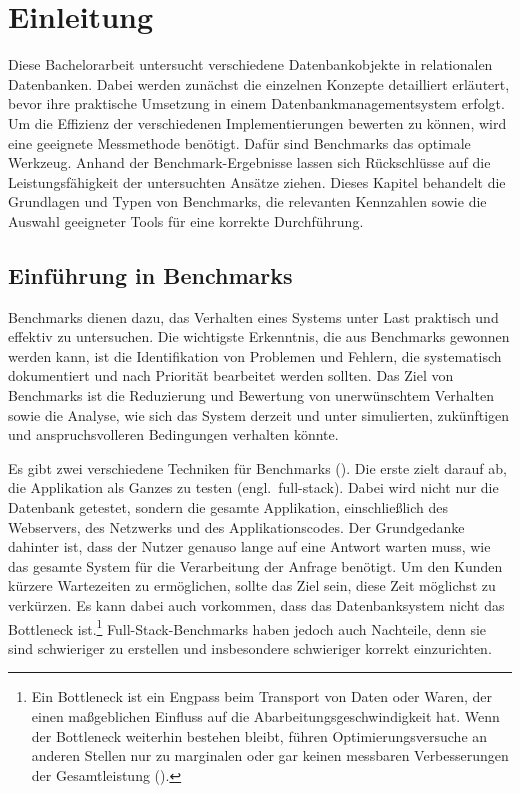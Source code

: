 \chapter{Einleitung}\label{ch:einleitung}

Diese Bachelorarbeit untersucht verschiedene Datenbankobjekte in relationalen Datenbanken.
Dabei werden zunächst die einzelnen Konzepte detailliert erläutert, bevor ihre praktische Umsetzung in einem Datenbankmanagementsystem erfolgt.
Um die Effizienz der verschiedenen Implementierungen bewerten zu können, wird eine geeignete Messmethode benötigt.
Dafür sind Benchmarks das optimale Werkzeug.
Anhand der Benchmark-Ergebnisse lassen sich Rückschlüsse auf die Leistungsfähigkeit der untersuchten Ansätze ziehen.
Dieses Kapitel behandelt die Grundlagen und Typen von Benchmarks, die relevanten Kennzahlen sowie die Auswahl geeigneter Tools für eine korrekte Durchführung.

\section{Einführung in Benchmarks}\label{sec:einleitung-einfuehrung}

Benchmarks dienen dazu, das Verhalten eines Systems unter Last praktisch und effektiv zu untersuchen.
Die wichtigste Erkenntnis, die aus Benchmarks gewonnen werden kann, ist die Identifikation von Problemen und Fehlern, die systematisch dokumentiert und nach Priorität bearbeitet werden sollten.
Das Ziel von Benchmarks ist die Reduzierung und Bewertung von unerwünschtem Verhalten sowie die Analyse, wie sich das System derzeit und unter simulierten, zukünftigen und anspruchsvolleren Bedingungen verhalten könnte.

Es gibt zwei verschiedene Techniken für Benchmarks (\cite[S. 35--49]{schwartz2012high}).
Die erste zielt darauf ab, die Applikation als Ganzes zu testen (engl.\ full-stack).
Dabei wird nicht nur die Datenbank getestet, sondern die gesamte Applikation, einschließlich des Webservers, des Netzwerks und des Applikationscodes.
Der Grundgedanke dahinter ist, dass der Nutzer genauso lange auf eine Antwort warten muss, wie das gesamte System für die Verarbeitung der Anfrage benötigt.
Um den Kunden kürzere Wartezeiten zu ermöglichen, sollte das Ziel sein, diese Zeit möglichst zu verkürzen.
Es kann dabei auch vorkommen, dass das Datenbanksystem nicht das Bottleneck ist.\footnote{Ein Bottleneck ist ein Engpass beim Transport von Daten oder Waren, der einen maßgeblichen Einfluss auf die Abarbeitungsgeschwindigkeit hat. Wenn der Bottleneck weiterhin bestehen bleibt, führen Optimierungsversuche an anderen Stellen nur zu marginalen oder gar keinen messbaren Verbesserungen der Gesamtleistung (\cite{bottleneck}).}
Full-Stack-Benchmarks haben jedoch auch Nachteile, denn sie sind schwieriger zu erstellen und insbesondere schwieriger korrekt einzurichten.

